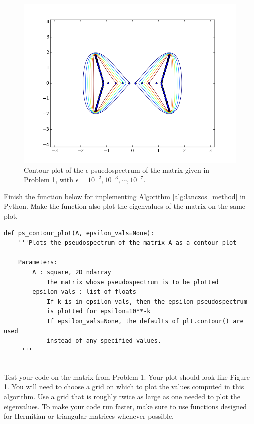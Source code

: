 \begin{figure}
\begin{center}
\includegraphics[width=\textwidth]{ps_contour}
\caption{Contour plot of the $\epsilon$-psuedospectrum of the matrix given in Problem 1, with $\epsilon=10^{-2},10^{-3},\cdots,10^{-7}$. }
\label{fig:ps_contour}
\end{center}
\end{figure}



\begin{problem}
Finish the function below for implementing Algorithm \ref{alg:lanczos_method} in Python. Make the function also plot the eigenvalues of the matrix on the same plot.

\begin{lstlisting}
def ps_contour_plot(A, epsilon_vals=None):
    '''Plots the pseudospectrum of the matrix A as a contour plot
    
    Parameters:
        A : square, 2D ndarray
            The matrix whose pseudospectrum is to be plotted
        epsilon_vals : list of floats
            If k is in epsilon_vals, then the epsilon-pseudospectrum
            is plotted for epsilon=10**-k
            If epsilon_vals=None, the defaults of plt.contour() are used
            instead of any specified values.
     '''
    
\end{lstlisting}

Test your code on the matrix from Problem 1. Your plot should look like Figure \ref{fig:ps_contour}. You will need to choose a grid on which to plot the values computed in this algorithm. Use a grid that is roughly twice as large as one needed to plot the eigenvalues. To make your code run faster, make sure to use functions designed for Hermitian or triangular matrices whenever possible.

\end{problem}

